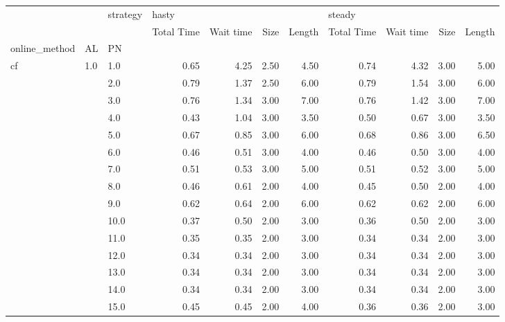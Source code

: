 \begin{tabular}{lllrrrrrrrr}
\toprule
   &     & strategy & \multicolumn{4}{l}{hasty} & \multicolumn{4}{l}{steady} \\
   &     & {} & Total Time & Wait time & Size & Length & Total Time & Wait time & Size & Length \\
online\_method & AL & PN &            &           &      &        &            &           &      &        \\
\midrule
cf & 1.0 & 1.0  &       0.65 &      4.25 & 2.50 &   4.50 &       0.74 &      4.32 & 3.00 &   5.00 \\
   &     & 2.0  &       0.79 &      1.37 & 2.50 &   6.00 &       0.79 &      1.54 & 3.00 &   6.00 \\
   &     & 3.0  &       0.76 &      1.34 & 3.00 &   7.00 &       0.76 &      1.42 & 3.00 &   7.00 \\
   &     & 4.0  &       0.43 &      1.04 & 3.00 &   3.50 &       0.50 &      0.67 & 3.00 &   3.50 \\
   &     & 5.0  &       0.67 &      0.85 & 3.00 &   6.00 &       0.68 &      0.86 & 3.00 &   6.50 \\
   &     & 6.0  &       0.46 &      0.51 & 3.00 &   4.00 &       0.46 &      0.50 & 3.00 &   4.00 \\
   &     & 7.0  &       0.51 &      0.53 & 3.00 &   5.00 &       0.51 &      0.52 & 3.00 &   5.00 \\
   &     & 8.0  &       0.46 &      0.61 & 2.00 &   4.00 &       0.45 &      0.50 & 2.00 &   4.00 \\
   &     & 9.0  &       0.62 &      0.64 & 2.00 &   6.00 &       0.62 &      0.62 & 2.00 &   6.00 \\
   &     & 10.0 &       0.37 &      0.50 & 2.00 &   3.00 &       0.36 &      0.50 & 2.00 &   3.00 \\
   &     & 11.0 &       0.35 &      0.35 & 2.00 &   3.00 &       0.34 &      0.34 & 2.00 &   3.00 \\
   &     & 12.0 &       0.34 &      0.34 & 2.00 &   3.00 &       0.34 &      0.34 & 2.00 &   3.00 \\
   &     & 13.0 &       0.34 &      0.34 & 2.00 &   3.00 &       0.34 &      0.34 & 2.00 &   3.00 \\
   &     & 14.0 &       0.34 &      0.34 & 2.00 &   3.00 &       0.34 &      0.34 & 2.00 &   3.00 \\
   &     & 15.0 &       0.45 &      0.45 & 2.00 &   4.00 &       0.36 &      0.36 & 2.00 &   3.00 \\

\end{tabular}
